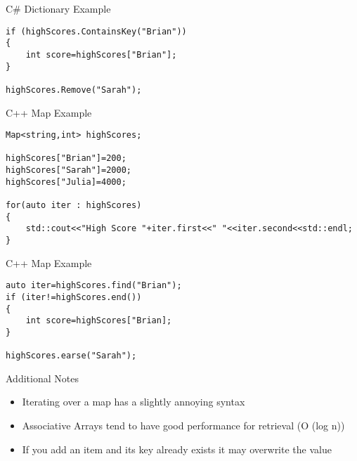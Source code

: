 \begin{frame}[fragile]{C\# Dictionary
	Example}
\begin{lstlisting}
if (highScores.ContainsKey("Brian"))
{
	int score=highScores["Brian"];
}

highScores.Remove("Sarah");
\end{lstlisting}
\end{frame}

\begin{frame}[fragile]{C++ Map
Example}
\begin{lstlisting}
Map<string,int> highScores;

highScores["Brian"]=200;
highScores["Sarah"]=2000;
highScores["Julia]=4000;

for(auto iter : highScores)
{
	std::cout<<"High Score "+iter.first<<" "<<iter.second<<std::endl;
}
\end{lstlisting}
\end{frame}

\begin{frame}[fragile]{C++ Map
	Example}
\begin{lstlisting}
auto iter=highScores.find("Brian");
if (iter!=highScores.end())
{
	int score=highScores["Brian];
}

highScores.earse("Sarah");
\end{lstlisting}
\end{frame}

\begin{frame}{Additional Notes}
\begin{itemize}
	\pause \item Iterating over a map has a slightly annoying syntax
	\pause \item Associative Arrays tend to have good performance for retrieval (O (log n))
	\pause \item If you add an item and its key already exists it may overwrite the value
\end{itemize}
\end{frame}